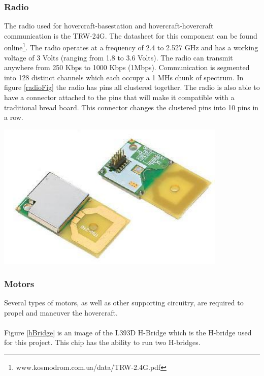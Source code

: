 \subsubsection{Radio}
The radio used for hovercraft-basestation and hovercraft-hovercraft communication is the TRW-24G.  The datasheet for this component can be found online\footnote{www.kosmodrom.com.ua/data/TRW-2.4G.pdf}.  The radio operates at a frequency of 2.4 to 2.527 GHz and has a working voltage of 3 Volts (ranging from 1.8 to 3.6 Volts).  The radio can transmit anywhere from 250 Kbps to 1000 Kbps (1Mbps).  Communication is segmented into 128 distinct channels which each occupy a 1 MHs chunk of spectrum. In figure \ref{radioFig}
the radio has pins all clustered together. The radio is also able to have a connector attached to the pins that will make it compatible with a traditional bread board. This connector changes the clustered pins into 10 pins in a row.

\begin{minipage}{6.5in}
  \centering
    \includegraphics[width=110mm]{imageSources/radio.png}
  
  \label{radioFig}
\end{minipage}

\subsubsection{Motors}
Several types of motors, as well as other supporting circuitry, are required to propel and maneuver the hovercraft. \\ 

\\

Figure \ref{hBridge} is an image of the L393D H-Bridge which is the H-bridge used for this project.  This chip has the ability to run two H-bridges. 


